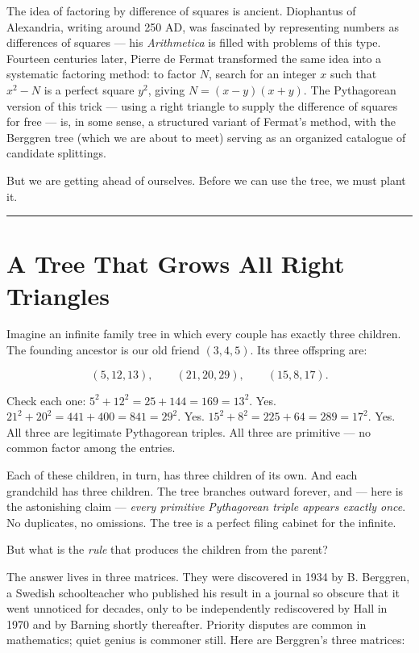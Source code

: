 The idea of factoring by difference of squares is ancient. Diophantus of Alexandria, writing around 250 AD, was fascinated by representing numbers as differences of squares --- his \emph{Arithmetica} is filled with problems of this type. Fourteen centuries later, Pierre de Fermat transformed the same idea into a systematic factoring method: to factor \(N\), search for an integer \(x\) such that \(x^2 - N\) is a perfect square \(y^2\), giving \(N = (x - y)(x + y)\). The Pythagorean version of this trick --- using a right triangle to supply the difference of squares for free --- is, in some sense, a structured variant of Fermat's method, with the Berggren tree (which we are about to meet) serving as an organized catalogue of candidate splittings.

But we are getting ahead of ourselves. Before we can use the tree, we must plant it.

\bigskip\noindent\rule{\linewidth}{0.4pt}\bigskip

\section{A Tree That Grows All Right Triangles}
Imagine an infinite family tree in which every couple has exactly three children. The founding ancestor is our old friend \((3, 4, 5)\). Its three offspring are:

\[(5, 12, 13), \qquad (21, 20, 29), \qquad (15, 8, 17).\]

Check each one: \(5^2 + 12^2 = 25 + 144 = 169 = 13^2\). Yes. \(21^2 + 20^2 = 441 + 400 = 841 = 29^2\). Yes. \(15^2 + 8^2 = 225 + 64 = 289 = 17^2\). Yes. All three are legitimate Pythagorean triples. All three are primitive --- no common factor among the entries.

Each of these children, in turn, has three children of its own. And each grandchild has three children. The tree branches outward forever, and --- here is the astonishing claim --- \emph{every primitive Pythagorean triple appears exactly once}. No duplicates, no omissions. The tree is a perfect filing cabinet for the infinite.

But what is the \emph{rule} that produces the children from the parent?

The answer lives in three matrices. They were discovered in 1934 by B. Berggren, a Swedish schoolteacher who published his result in a journal so obscure that it went unnoticed for decades, only to be independently rediscovered by Hall in 1970 and by Barning shortly thereafter. Priority disputes are common in mathematics; quiet genius is commoner still. Here are Berggren's three matrices:

